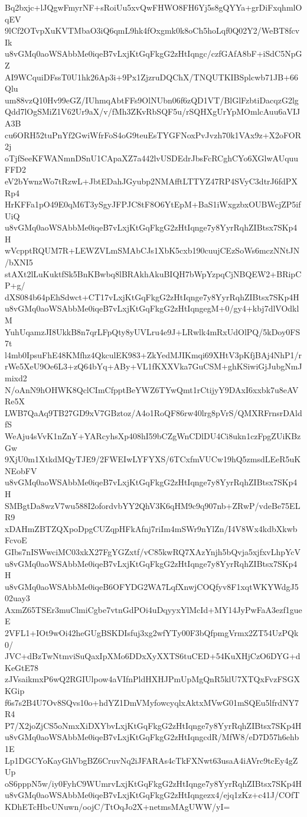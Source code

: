 Bq2bxjc+lJQgwFmyrNF+sRoiUu5xvQwFHWO8FH6Yj5s8gQYYa+grDiFxqhmlOqEV
9lCf2OTvpXuKVTMbaO3iQ6qmL9hk4fOxgmk0k8oCh5hoLqf0Q02Y2/WeBT8fcvIk
u8vGMq0aoWSAbbMe0iqeB7vLxjKtGqFkgG2zHtIqngc/czfGAfA8bF+iSdC5NpGZ
AI9WCquiDFssT0U1hk26Ap3i+9Px1ZjzruDQChX/TNQUTKIBSplcwb71JB+66Qlu
um88vzQ10Hv99eGZ/IUhmqAbtFFs9OlNUbn06f6zQD1VT/BlGlFzbtiDacqzG2lg
Qdd7lOgSMiZ1V62Ur9aX/v/fMh3ZKvRbSQF5u/rSQHXgUrYpMOmlcAuu6aVIJA3B
cu6ORH52tuPnYf2GwiWfrFoS4oG9teuEsTYGFNoxPvJvzh70k1VAx9z+X2oFOR2j
oTjfSeeKFWANmnDSnU1CApaXZ7a442lvUSDEdrJbsFcRCghCYo6XGlwAUquuFFD2
eV2bYwnzWo7tRzwL+JbtEDahJGyubp2NMAfftLTTYZ47RP4SVyC3dtrJ6fdPXRp4
HrKFFa1pO49E0qM6T3ySgyJFPJC8tF8O6YtEpM+BaS1iWxgzbxOUBWcjZP5ifUiQ
u8vGMq0aoWSAbbMe0iqeB7vLxjKtGqFkgG2zHtIqnge7y8YyrRqhZIBtsx7SKp4H
wVcpptRQUM7R+LEWZVLmSMAbCJs1XbK5cxb190cuujCEzSoWs6mczNNtJN/bXNI5
stAXt2lLuKuktfSk5BnKBwbq8lBRAkhAkuBIQH7bWpYzpqCjNBQEW2+BRipCP+g/
dXS084b64pEhSdwct+CT17vLxjKtGqFkgG2zHtIqnge7y8YyrRqhZIBtsx7SKp4H
u8vGMq0aoWSAbbMe0iqeB7vLxjKtGqFkgG2zHtIqngegM+0/gy4+kbj7dlVOdklM
YuhUqamzJI8UkkB8n7qrLFpQty8yUVLru4e9J+LRwlk4mRxUdOlPQ/5kDoy0FS7t
l4mb0IpsuFhE48KMfhz4QkculEK983+ZkYedMJIKmqi69XHtV3pKfjBAj4NhP1/r
rWe5XeU9Oe6L3+zQ64bYq+ABy+VL1fKXXVka7GuCSM+ghKSiwiGjJubgNmJmixd2
N/oAnN9hOHWK8QclCImCfpptBeYWZ6TYwQmt1rCtijyY9DAxI6xxbk7u8eAVRe5X
LWB7QaAq9TB27GD9xV7GBztoz/A4o1RoQF86rw40lrg8pVrS/QMXRFrnsrDAldfS
WeAju4sVvK1nZnY+YARcyhsXp408hI59bCZgWnCDlDU4Ci8ukn1czFpgZUiKBzGw
9XjU0m1XtkdMQyTJE9/2FWEIwLYFYXS/6TCxfmVUCw19hQ5zmsdLEeR5uKNEobFV
u8vGMq0aoWSAbbMe0iqeB7vLxjKtGqFkgG2zHtIqnge7y8YyrRqhZIBtsx7SKp4H
SMBgtDa8wzV7wu588I2ofordvbYY2QhV3K6qHM9c9q907nb+ZRwP/vdeBe75ELR9
xDAHmZBTZQXpoDpgCUZqpHFkAfnj7riIm4mSWr9nYlZn/I4V8Wx4kdbXkwbFcvoE
GIbs7nISWwciMC03xkX27FgYGZxtf/vC85kwRQ7XAzYnjh5bQvja5xjfxvLhpYcV
u8vGMq0aoWSAbbMe0iqeB7vLxjKtGqFkgG2zHtIqnge7y8YyrRqhZIBtsx7SKp4H
u8vGMq0aoWSAbbMe0iqeB6OFYDG2WA7LqfXnwjCOQfyv8F1xqtWKYWdgJ502uay3
AxmZ65TSEr3muClmiCgbe7vtnGdPOi4uDqyyxYlMcId+MY14JyPwFaA3ezf1gueE
2VFL1+IOt9wOi42heGUgBSKDIsfuj3xg2wfYTy00F3bQfpmgVrmx2ZT54UzPQk0/
JVC+dBzTwNtmviSuQaxIpXMo6DDxXyXXTS6tuCED+54KuXHjCzO6DYG+dKeGtE78
zJVsaikmxP6wQ2RGIUlpow4aVIfnPldHXHJPmUpMgQnR5klU7XTQxFvzFSGXKGip
f6s7s2B4U7Ov8SQvs10o+hdYZ1DmVMyfowcyqlxAktxMVwG01mSQEu5lfrdNY7R4
P7/X2joZjCS5oNmxXiDXYbvLxjKtGqFkgG2zHtIqnge7y8YyrRqhZIBtsx7SKp4H
u8vGMq0aoWSAbbMe0iqeB7vLxjKtGqFkgG2zHtIqngcdR/MfW8/eD7D57h6ehb1E
Lp1DGCYoKayGhVbgBZ6CruvNq2iJFARAs4cTkFXNwt63usaA4iAVrc9tcEy4gZUp
oS6pppN5w/iy0FyhC9WUmrvLxjKtGqFkgG2zHtIqnge7y8YyrRqhZIBtsx7SKp4H
u8vGMq0aoWSAbbMe0iqeB7vLxjKtGqFkgG2zHtIqngezx4/ejq1zKz+c41J/COfT
KDhETcHbcUNuwn/oojC/TtOqJo2X+netmsMAgUWW/yI=
